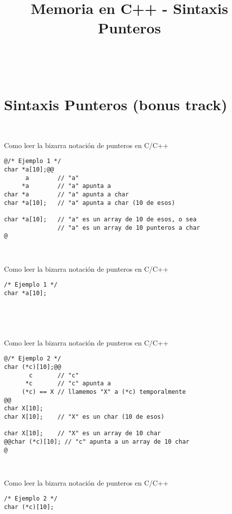 

\title%
{Memoria en C++ - Sintaxis Punteros}


\subject{Memoria en C++ - Sintaxis Punteros}




\begin{frame}
   \titlepage
\end{frame}


~%
\section{Sintaxis Punteros (bonus track)}

~%
\begin{frame}[fragile]{Como leer la bizarra notaci\'on de punteros en C/C++}
         \begin{lstlisting}[style=dimmided]
@/* Ejemplo 1 */
char *a[10];@@
      a        // "a"
     *a        // "a" apunta a
char *a        // "a" apunta a char
char *a[10];   // "a" apunta a char (10 de esos)

char *a[10];   // "a" es un array de 10 de esos, o sea
               // "a" es un array de 10 punteros a char
@
         \end{lstlisting}
\end{frame}
~%
\begin{frame}[fragile,t]{Como leer la bizarra notaci\'on de punteros en C/C++}
         \begin{lstlisting}[style=normal]
/* Ejemplo 1 */
char *a[10];
         \end{lstlisting}
\end{frame}
~%


~%
\begin{frame}[fragile]{Como leer la bizarra notaci\'on de punteros en C/C++}
         \begin{lstlisting}[style=dimmided]
@/* Ejemplo 2 */
char (*c)[10];@@
       c       // "c"
      *c       // "c" apunta a
     (*c) == X // llamemos "X" a (*c) temporalmente
@@
char X[10];
char X[10];    // "X" es un char (10 de esos)

char X[10];    // "X" es un array de 10 char
@@char (*c)[10]; // "c" apunta a un array de 10 char
@
         \end{lstlisting}
\end{frame}
~%
\begin{frame}[fragile,t]{Como leer la bizarra notaci\'on de punteros en C/C++}
         \begin{lstlisting}[style=normal]
/* Ejemplo 2 */
char (*c)[10];
         \end{lstlisting}
\end{frame}
~%


